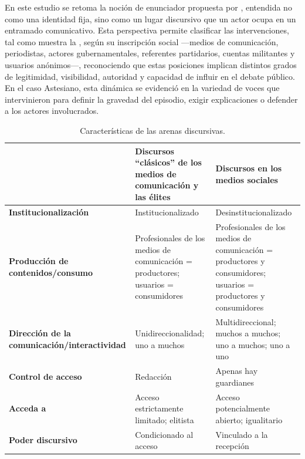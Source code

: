 \documentclass[spanish]{textolivre}
\begin{document}
En este estudio se retoma la noción de enunciador propuesta por \textcite{muller2020estudios}, entendida no como una identidad fija, sino como un lugar discursivo que un actor ocupa en un entramado comunicativo. Esta perspectiva permite clasificar las intervenciones, tal como muestra la , según su inscripción social —medios de comunicación, periodistas, actores gubernamentales, referentes partidarios, cuentas militantes y usuarios anónimos—, reconociendo que estas posiciones implican distintos grados de legitimidad, visibilidad, autoridad y capacidad de influir en el debate público. En el caso Astesiano, esta dinámica se evidenció en la variedad de voces que intervinieron para definir la gravedad del episodio, exigir explicaciones o defender a los actores involucrados.

\begin{table}[htbp]
\centering
\begin{threeparttable}
\caption{Características de las arenas discursivas.}
\label{tab1}

\footnotesize

\begin{tabularx}{\textwidth}{
>{\raggedright\arraybackslash}p{}
>{\raggedright\arraybackslash}X
>{\raggedright\arraybackslash}X}
\toprule
&
\textbf{Discursos ``clásicos'' de los medios de comunicación y las élites} &
\textbf{Discursos en los medios sociales} \\
\midrule

\textbf{Institucionalización} &
Institucionalizado &
Desinstitucionalizado \\

\addlinespace

\textbf{Producción de contenidos/consumo} &
Profesionales de los medios de comunicación = productores; usuarios = consumidores &
Profesionales de los medios de comunicación = productores y consumidores; usuarios = productores y consumidores \\

\addlinespace

\textbf{Dirección de la comunicación/interactividad} &
Unidireccionalidad; uno a muchos &
Multidireccional; muchos a muchos; uno a muchos; uno a uno \\

\addlinespace

\textbf{Control de acceso} &
Redacción &
Apenas hay guardianes \\

\addlinespace

\textbf{Acceda a} &
Acceso estrictamente limitado; elitista &
Acceso potencialmente abierto; igualitario \\

\addlinespace

\textbf{Poder discursivo} &
Condicionado al acceso &
Vinculado a la recepción \\

\bottomrule
\end{tabularx}
\end{threeparttable}
\end{table}
\end{document}
